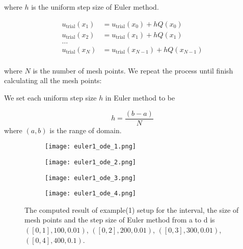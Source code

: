 \documentclass{article}
\begin{document}
	\medspace \noindent
	where $h$ is the uniform step size of Euler method.  
   

    
    \medspace \noindent
   	\begin{equation}
   \begin{aligned}
   u_{\text{trial}}(x_{1}) &= u_{\text{trial}}(x_{0}) +hQ(x_0) \\
   u_{\text{trial}}(x_{2}) &= u_{\text{trial}}(x_{1}) +hQ(x_1)\\
   \dots \\
   u_{\text{trial}}(x_{N}) &= u_{\text{trial}}(x_{N-1}) +hQ(x_{N-1}) \\
   \end{aligned}
   \end{equation}
  
    \medspace \noindent
     where $N$ is the number of mesh points.  We repeat the process until finish calculating all the mesh points: 
    
     \medspace \noindent
     We set each uniform step size $h$  in Euler method to be
    
    \begin{equation}
      h = \frac{(b-a)}{N}
    \end{equation}
    \medspace \noindent
    where $(a,b)$ is the range of domain. 
    
    \begin{figure}[b]
    	\begin{subfigure}{.85\textwidth}
    		\centering
    		\texttt{[image: euler1\_ode\_1.png]}
    	
    	\end{subfigure}
    	\begin{subfigure}{.85\textwidth}
    	\centering
    	\texttt{[image: euler1\_ode\_2.png]}
    
    	\end{subfigure}
		\begin{subfigure}{.85\textwidth}
		\centering
		\texttt{[image: euler1\_ode\_3.png]}
	
		\end{subfigure}
		\begin{subfigure}{.85\textwidth}
			\centering
			\texttt{[image: euler1\_ode\_4.png]}
			
		\end{subfigure}
	\caption{The computed result of example(1) setup for  the interval, the size of mesh points and the step size of Euler method from a to d is $([0,1],100,0.01)$, $([0,2],200,0.01)$, $([0,3],300,0.01)$, $([0,4],400,0.1)$. } 
	\label{fig: euler1_ode}
    \end{figure}
\end{document}
